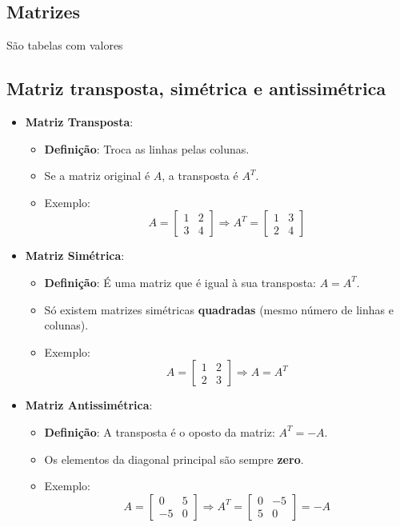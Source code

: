 \documentclass{article}
\begin{document}
\subsection{Matrizes}
São tabelas com valores

\subsection{Matriz transposta, simétrica e antissimétrica}
\begin{itemize}
    \item \textbf{Matriz Transposta}:
    \begin{itemize}
        \item \textbf{Definição}: Troca as linhas pelas colunas.
        \item Se a matriz original é \( A \), a transposta é \( A^T \).
        \item Exemplo:
        \[
        A =
        \begin{bmatrix}
        1 & 2 \\
        3 & 4
        \end{bmatrix}
        \Rightarrow
        A^T =
        \begin{bmatrix}
        1 & 3 \\
        2 & 4
        \end{bmatrix}
        \]
    \end{itemize}

    \item \textbf{Matriz Simétrica}:
    \begin{itemize}
        \item \textbf{Definição}: É uma matriz que é igual à sua transposta: \( A = A^T \).
        \item Só existem matrizes simétricas \textbf{quadradas} (mesmo número de linhas e colunas).
        \item Exemplo:
        \[
        A =
        \begin{bmatrix}
        1 & 2 \\
        2 & 3
        \end{bmatrix}
        \Rightarrow A = A^T
        \]
    \end{itemize}

    \item \textbf{Matriz Antissimétrica}:
    \begin{itemize}
        \item \textbf{Definição}: A transposta é o oposto da matriz: \( A^T = -A \).
        \item Os elementos da diagonal principal são sempre \textbf{zero}.
        \item Exemplo:
        \[
        A =
        \begin{bmatrix}
        0 & 5 \\
        -5 & 0
        \end{bmatrix}
        \Rightarrow A^T =
        \begin{bmatrix}
        0 & -5 \\
        5 & 0
        \end{bmatrix} = -A
        \]
    \end{itemize}
\end{itemize}
\end{document}
